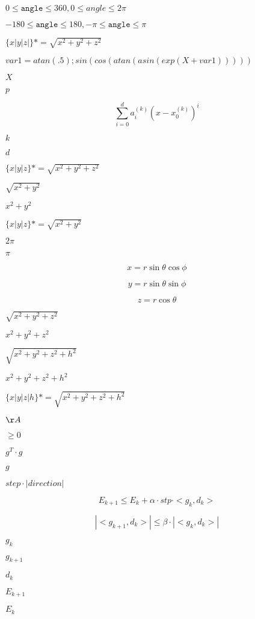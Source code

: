 \documentclass{article}
\begin{document}
$0 \le \mathtt{angle} \le 360, 0 \le angle \le 2 \pi$
\pagebreak

$-180 \le \mathtt{angle} \le 180, -\pi \le \mathtt{angle} \le \pi$
\pagebreak

$\{x|y|z|\} *= \sqrt{x^2 + y^2 + z^2}$
\pagebreak

$var1=atan(.5); sin(cos(atan(asin(exp(X+var1)))))$
\pagebreak

$X$
\pagebreak

$p$
\pagebreak

\[\sum_{i=0}^{d} a_i^{(k)} (x - x_0^{(k)})^i\]
\pagebreak

$k$
\pagebreak

$d$
\pagebreak

$\{x|y|z\} *= \sqrt{x^2 + y^2 + z^2}$
\pagebreak

$\sqrt{x^2 + y^2}$
\pagebreak

$x^2 + y^2$
\pagebreak

$\{x|y|z\} *= \sqrt{x^2 + y^2}$
\pagebreak

$2 \pi$
\pagebreak

$\pi$
\pagebreak

\[ x = r \sin \theta \cos \phi \]
\pagebreak

\[ y = r \sin \theta \sin \phi \]
\pagebreak

\[ z = r \cos \theta \]
\pagebreak

$\sqrt{x^2 + y^2 + z^2}$
\pagebreak

$x^2 + y^2 + z^2$
\pagebreak

$\sqrt{x^2 + y^2 + z^2 + h^2}$
\pagebreak

$x^2 + y^2 + z^2 + h^2$
\pagebreak

$\{x|y|z|h\} *= \sqrt{x^2 + y^2 + z^2 + h^2}$
\pagebreak

${\AA}$
\pagebreak

$\geq 0$
\pagebreak

$g^T \cdot g$
\pagebreak

$g$
\pagebreak

$step\cdot|direction|$
\pagebreak

\[E_{k+1} \leq E_k + \alpha\cdot stp\cdot<g_k, d_k>\]
\pagebreak

\[|<g_{k+1}, d_k>| \leq \beta\cdot |<g_k, d_k>|\]
\pagebreak

$g_k$
\pagebreak

$g_{k+1}$
\pagebreak

$d_k$
\pagebreak

$E_{k+1}$
\pagebreak

$E_k$
\pagebreak
\end{document}
